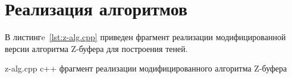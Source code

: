\section{Реализация алгоритмов}

В листингe~\ref{lst:z-alg.cpp} приведен фрагмент реализации модифицированной версии алгоритма Z-буфера для построения теней.
	
\newpage
{}
{z-alg.cpp} %
{c++} %
{фрагмент реализации модифицированного алгоритма Z-буфера} %

